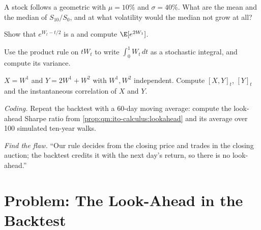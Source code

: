 \begin{exercise}[$\star$]\label{exo:qm:ito-calculus:3}
A stock follows a geometric  with $\mu = 10\%$ and $\sigma = 40\%$. What are the mean
and the median of $S_{10}/S_0$, and at what volatility would the median not grow at all?
\end{exercise}

\begin{exercise}[$\star\star$]\label{exo:qm:ito-calculus:4}
Show that $e^{W_t - t/2}$ is a  and compute $\E[e^{2W_1}]$.
\end{exercise}

\begin{exercise}[$\star\star$]\label{exo:qm:ito-calculus:5}
Use the product rule on $tW_t$ to write $\int_0^1 W_t\,dt$ as a stochastic integral, and compute its
variance.
\end{exercise}

\begin{exercise}[$\star\star$]\label{exo:qm:ito-calculus:6}
$X = W^1$ and $Y = 2W^1 + W^2$ with $W^1, W^2$ independent. Compute $[X, Y]_t$, $[Y]_t$ and the
instantaneous correlation of $X$ and $Y$.
\end{exercise}

\begin{exercise}[$\star\star\star$]\label{exo:qm:ito-calculus:7}
\emph{Coding.} Repeat the backtest with a 60-day moving average: compute the look-ahead Sharpe
ratio from \cref{prop:qm:ito-calculus:lookahead} and its average over 100 simulated ten-year walks.
\end{exercise}

\begin{exercise}[$\star\star\star$]\label{exo:qm:ito-calculus:8}
\emph{Find the flaw.} ``Our rule decides from the closing price and trades in the closing
auction; the backtest credits it with the next day's return, so there is no look-ahead.''
\end{exercise}

\section{Problem: The Look-Ahead in the Backtest}

